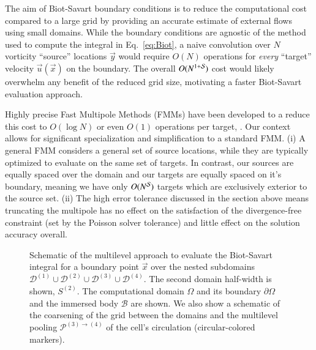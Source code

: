 \documentclass[final,1p,times]{elsarticle}
\begin{document}
The aim of Biot-Savart boundary conditions is to reduce the computational cost compared to a large grid by providing an accurate estimate of external flows using small domains. While the boundary conditions are agnostic of the method used to compute the integral in Eq.~\ref{eq:Biot}, a naive convolution over $N$ vorticity ``source'' locations $\vec y$ would require $O(N)$ operations for \textit{every} ``target'' velocity $\vec u(\vec x)$ on the boundary. The overall $O(N^{1+\cal S})$ cost would likely overwhelm any benefit of the reduced grid size, motivating a faster Biot-Savart evaluation approach.


Highly precise Fast Multipole Methods (FMMs) have been developed to a reduce this cost to $O(\log N)$ or even $O(1)$ operations per target, \cite{Greencard1987ASimulations,Ying2004ADimensions, Fong2009TheMethod}. Our context allows for significant specialization and simplification to a standard FMM. (i) A general FMM considers a general set of source locations, while they are typically optimized to evaluate on the same set of targets. In contrast, our sources are equally spaced over the domain and our targets are equally spaced on it's boundary, meaning we have only $O(N^{\cal S})$ targets which are exclusively exterior to the source set. (ii) The high error tolerance discussed in the section above means truncating the multipole has no effect on the satisfaction of the divergence-free constraint (set by the Poisson solver tolerance) and little effect on the solution accuracy overall.

\begin{figure}
    \centering
    \def\svgwidth{0.7\columnwidth}
    
    \caption{Schematic of the multilevel approach to evaluate the Biot-Savart integral for a boundary point $\vec x$ over the nested subdomains $\mathcal{D}^{(1)} \cup \mathcal{D}^{(2)} \cup \mathcal{D}^{(3)} \cup \mathcal{D}^{(4)}$. The second domain half-width is shown, ${S}^{(2)}$. The computational domain $\Omega$ and its boundary $\partial\Omega$ and the immersed body $\mathcal{B}$ are shown. We also show a schematic of the coarsening of the grid between the domains and the multilevel pooling $\mathcal{P}^{(3)\to(4)}$ of the cell's circulation (circular-colored markers). 
    }
    \label{Fig_2}
\end{figure}
\end{document}
